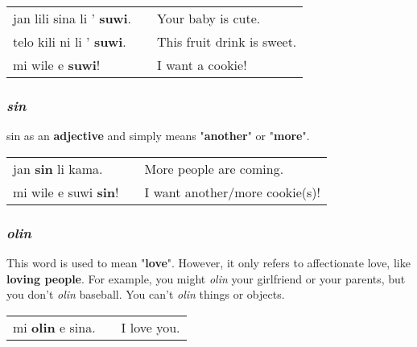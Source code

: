 \begin{supertabular}{p{5,5cm}|ll}
jan lili sina li ' \textbf{suwi}. && Your baby is cute. \\
telo kili ni li ' \textbf{suwi}. && This fruit drink is sweet. \\
mi wile e \textbf{suwi}! && I want a cookie! \\
\end{supertabular} 
%
\subsubsection*{\textit{sin}}
%
sin as an \textbf{adjective} and simply means "\textbf{another}" or "\textbf{more}". 

\begin{supertabular}{p{5,5cm}|ll}
jan \textbf{sin} li kama. && More people are coming. \\
mi wile e suwi \textbf{sin}! && I want another/more cookie(s)! \\
\end{supertabular} 
%
\subsubsection*{\textit{olin}}
%
This word is used to mean "\textbf{love}". 
However, it only refers to affectionate love, like \textbf{loving people}. 
For example, you might \textit{olin} your girlfriend or your parents, but you don't \textit{olin} baseball. 
You can't \textit{olin} things or objects. 

\begin{supertabular}{p{5,5cm}|ll}
mi \textbf{olin} e sina. && I love you. \\
\end{supertabular}  
%
